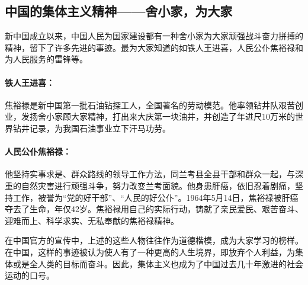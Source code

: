 \subsection{中国的集体主义精神——舍小家，为大家}
\par
新中国成立以来，中国人民为国家建设都有一种舍小家为大家顽强战斗奋力拼搏的精神，留下了许多先进的事迹。最为大家知道的如铁人王进喜，人民公仆焦裕禄和为人民服务的雷锋等。

\paragraph{铁人王进喜：}
焦裕禄是新中国第一批石油钻探工人，全国著名的劳动模范。他率领钻井队艰苦创业，发扬舍小家顾大家精神，打出来大庆第一块油井，并创造了年进尺10万米的世界钻井记录，为我国石油事业立下汗马功劳。
\paragraph{人民公仆焦裕禄：}
他坚持实事求是、群众路线的领导工作方法，同兰考县全县干部和群众一起，与深重的自然灾害进行顽强斗争，努力改变兰考面貌。他身患肝癌，依旧忍着剧痛，坚持工作，被誉为“党的好干部”、“人民的好公仆”。1964年5月14日，焦裕禄被肝癌夺去了生命，年仅42岁。焦裕禄用自己的实际行动，铸就了亲民爱民、艰苦奋斗、迎难而上、科学求实、无私奉献的焦裕禄精神。
\vspace{1em}
\par
在中国官方的宣传中，上述的这些人物往往作为道德楷模，成为大家学习的榜样。在中国，这样的事迹被认为使人有了一种更高的人生境界，即放弃个人利益，为集体或是全人类的目标而奋斗。因此，集体主义也成为了中国过去几十年激进的社会运动的口号。
